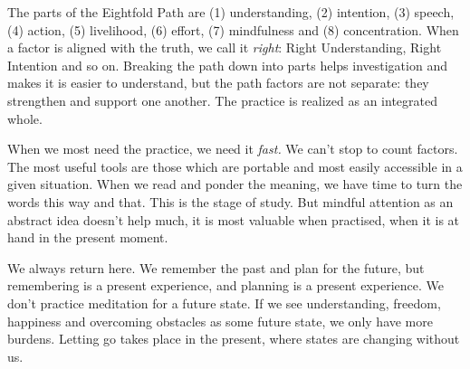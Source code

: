 The parts of the Eightfold Path are (1) understanding, (2) intention,
(3) speech, (4) action, (5) livelihood, (6) effort, (7) mindfulness and
(8) concentration. When a factor is aligned with the truth, we call it
\emph{right}: Right Understanding, Right Intention and so on. Breaking
the path down into parts helps investigation and makes it is easier to
understand, but the path factors are not separate: they strengthen and
support one another. The practice is realized as an integrated whole.

When we most need the practice, we need it \emph{fast.} We can't stop to
count factors. The most useful tools are those which are portable and
most easily accessible in a given situation. When we read and ponder the
meaning, we have time to turn the words this way and that. This is the
stage of study. But mindful attention as an abstract idea doesn't help
much, it is most valuable when practised, when it is at hand in the
present moment.

We always return here. We remember the past and plan for the future, but
remembering is a present experience, and planning is a present
experience. We don't practice meditation for a future state. If we see
understanding, freedom, happiness and overcoming obstacles as some
future state, we only have more burdens. Letting go takes place in the
present, where states are changing without us.
